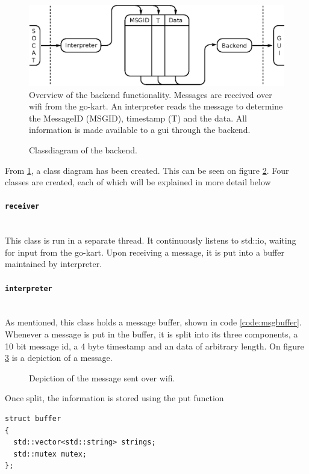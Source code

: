 \begin{figure}
	\includegraphics[width=\linewidth]{graphics/backend_concept}
	\caption[Overview of the backend functionality.]{Overview of the backend functionality. 
	Messages are received over wifi from the go-kart. 
	An interpreter reads the message to determine the MessageID (MSGID), timestamp (T) and the data. 
	All information is made available to a \acs{gui} through the backend.}
	\label{fig:backendconcept}
\end{figure}

\begin{figure}[H]
	\caption[Backend class diagram.]{Classdiagram of the backend.}
	\label{fig:backendclass}
\end{figure}

From \ref{fig:backendconcept}, a class diagram has been created.
This can be seen on figure \ref{fig:backendclass}.
Four classes are created, each of which will be explained in more detail below

\paragraph*{\texttt{receiver}}~\\
This class is run in a separate thread.
It continuously listens to std::io, waiting for input from the go-kart.
Upon receiving a message, it is put into a buffer maintained by interpreter.
\paragraph*{\texttt{interpreter}}~\\
As mentioned, this class holds a message buffer, shown in code \ref{code:msgbuffer}.
Whenever a message is put in the buffer, it is split into its three components, a 10 bit message id, a 4 byte timestamp and an data of arbitrary length.
On figure \ref{fig:backendmsg} is a depiction of a message.
\begin{figure}[H]
	\caption[Wifi Message.]{Depiction of the message sent over wifi.}
	\label{fig:backendmsg}
\end{figure}

Once split, the information is stored using the put function 
\begin{lstlisting}[caption=Buffer for holding incomming messages,label=code:msgbuffer]
struct buffer 
{
  std::vector<std::string> strings;
  std::mutex mutex;
};
\end{lstlisting}
